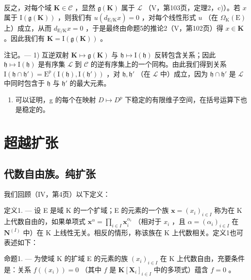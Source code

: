 反之，对每个域 \(\mathbf{K} \in \mathcal{C}\) ，显然 \(\mathfrak{g}(\mathbf{K})\) 属于 \(\mathcal{L}\) （V，第103页，定理2，c)）。若 \(x\) 属于 \(\mathrm{I}(\mathfrak{g}(\mathbf{K}))\) ，则我们有 \(u(d_{\mathrm{E/K}} x) = 0\) ，对每个线性形式 \(u\) （在 \(\Omega_{\mathrm{K}}(\mathrm{E})\) 上）成立，从而 \(d_{\mathrm{E/K}} x = 0\) ，于是最终由命题5的推论2（V，第102页）得 \(x \in \mathbf{K}\) 。因此我们有 \(\mathbf{K} = \mathrm{I}(\mathfrak{g}(\mathbf{K}))\) 。

注记。--- 1) 互逆双射 \(\mathbf{K} \mapsto \mathfrak{g}(\mathbf{K})\) 与 \(\mathfrak{h} \mapsto \mathrm{I}(\mathfrak{h})\) 反转包含关系；因此 \(\mathfrak{h} \mapsto \mathrm{I}(\mathfrak{h})\) 是有序集 \(\mathcal{L}\) 到 \(\mathcal{C}\) 的逆有序集上的一个同构。由此我们得到关系 \(\mathrm{I}(\mathfrak{h} \cap \mathfrak{h}') = \mathrm{E}^p(\mathrm{I}(\mathfrak{h}), \mathrm{I}(\mathfrak{h}'))\) ，对 \(\mathfrak{h}, \mathfrak{h}'\) （在 \(\mathcal{L}\) 中）成立，因为 \(\mathfrak{h} \cap \mathfrak{h}'\) 是 \(\mathcal{L}\) 中同时包含于 \(\mathfrak{h}\) 与 \(\mathfrak{h}'\) 的最大元素。

\begin{enumerate}
\def\labelenumi{\arabic{enumi})}
\setcounter{enumi}{1}
\tightlist
\item
  可以证明，g 的每个在映射 \(D \mapsto D^{p}\) 下稳定的有限维子空间，在括号运算下也是稳定的。
\end{enumerate}

\section{超越扩张}

\subsection{代数自由族。纯扩张}

我们回顾（IV，第4页）以下定义：

定义1. --- 设 E 是域 K 的一个扩域；E 的元素的一个族 \(\mathbf{x} = (x_i)_{i \in I}\) 称为在 K 上代数自由的，如果单项式 \(\mathbf{x}^\alpha = \prod_{i \in I} \mathbf{x}_i^{\alpha_i}\) （相对于 \(x_i\) ，且 \(\alpha = (\alpha_i)_{i \in I}\) 在 \(\mathbf{N}^{(I)}\) 中）在 K 上线性无关。相反的情形，称该族在 K 上代数相关。定义1也可表述如下：

命题1. --- 为使域 K 的扩域 E 的元素的族 \((x_{i})_{i\in I}\) 在 K 上代数自由，充要条件是：关系 \(f((x_i)) = 0\) （其中 \(f\) 是 \(\mathbf{K}[\mathbf{X}_i]_{i\in I}\) 中的多项式）蕴含 \(f = 0\) 。

